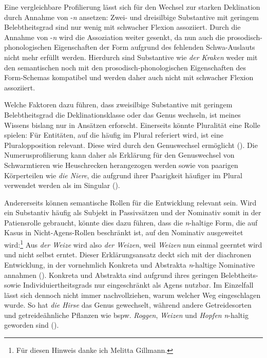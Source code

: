  

Eine vergleichbare Profilierung lässt sich für den Wechsel zur starken Deklination durch Annahme von -\textit{n} ansetzen: Zwei- und dreisilbige Substantive mit geringem Belebtheitsgrad sind nur wenig mit schwacher Flexion assoziiert. Durch die Annahme von -\textit{n} wird die Assoziation weiter gesenkt, da nun auch die prosodisch-phonologischen Eigenschaften der Form aufgrund des fehlenden Schwa-Auslauts nicht mehr erfüllt werden. Hierdurch sind Substantive wie \textit{der Kraken} weder mit den semantischen noch mit den prosodisch-phonologischen Eigenschaften des Form-Schemas kompatibel und werden daher auch nicht mit schwacher Flexion assoziiert. 

Welche Faktoren dazu führen, dass zweisilbige Substantive mit geringem Belebtheitsgrad die Deklinationsklasse oder das Genus wechseln, ist meines Wissens bislang nur in Ansätzen erforscht. Einerseits könnte Pluralität eine Rolle spielen: Für Entitäten, auf die häufig im Plural referiert wird, ist eine Pluralopposition relevant. Diese wird durch den Genuswechsel ermöglicht (\cite[305]{Nubling.2008}). Die Numerusprofilierung kann daher als Erklärung für den Genuswechsel von Schwarmtieren wie Heuschrecken herangezogen werden sowie von paarigen Körperteilen wie \textit{die Niere}, die aufgrund ihrer Paarigkeit häufiger im Plural verwendet werden als im Singular (\cite[305]{Nubling.2008}). 



Andererseits können semantische Rollen für die Entwicklung relevant sein. Wird ein Substantiv häufig als Subjekt in Passivsätzen und der Nominativ somit in der Patiensrolle gebraucht, könnte dies dazu führen, dass die \textit{n}-haltige Form, die auf Kasus in Nicht-Agens-Rollen beschränkt ist, auf den Nominativ ausgeweitet wird:\footnote{Für diesen Hinweis danke ich Melitta Gillmann.} Aus \textit{der Weize} wird also \textit{der Weizen}, weil \textit{Weizen} nun einmal geerntet wird und nicht selbst erntet. Dieser Erklärungsansatz deckt sich mit der diachronen Entwicklung, in der vornehmlich Konkreta und Abstrakta \textit{n}-haltige Nominative annahmen (\cite[120]{Kopcke.2000}). Konkreta und Abstrakta sind aufgrund ihres geringen Belebtheits- sowie Individuiertheitsgrads nur eingeschränkt als Agens nutzbar. Im Einzelfall lässt sich dennoch nicht immer nachvollziehen, warum welcher Weg eingeschlagen wurde. So hat \textit{die Hirse} das Genus gewechselt, während andere Getreidesorten und getreideähnliche Pflanzen wie bspw. \textit{Roggen}, \textit{Weizen} und \textit{Hopfen} \textit{n}-haltig geworden sind (\cite[120--121]{Kopcke.2000}).     

